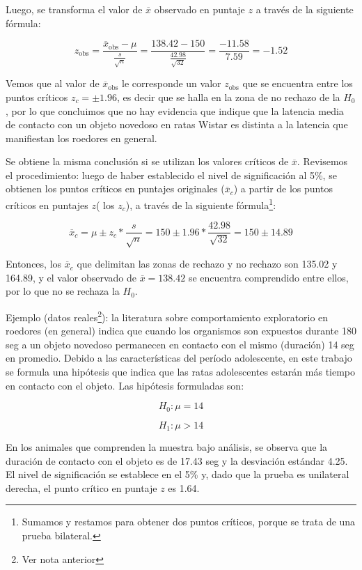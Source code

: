 \documentclass[]{book}
\let\rmarkdownfootnote\footnote%
\def\footnote{\protect\rmarkdownfootnote}
\begin{document}
Luego, se transforma el valor de \(\overline{x}\) observado en puntaje \(z\) a través de la siguiente fórmula:

\[z_{\text{obs}} = \frac{{\overline{x}}_{\text{obs}} - \mu}{\frac{s}{\sqrt{n}}} = \frac{138.42 - 150}{\frac{42.98}{\sqrt{32}}} = \frac{- 11.58}{7.59} = - 1.52\]

Vemos que al valor de \({\overline{x}}_{\text{obs}}\) le corresponde un
valor \(z_{\text{obs}}\) que se encuentra entre los puntos críticos \(z_{c}=\pm 1.96\), es decir que se halla en la zona de no rechazo de la \(H_{0}\), por lo que concluimos que no hay evidencia que indique que la latencia media de contacto con un objeto novedoso en ratas Wistar es distinta a la latencia que manifiestan los roedores en general.

Se obtiene la misma conclusión si se utilizan los valores críticos de
\(\overline{x}\). Revisemos el procedimiento: luego de haber establecido
el nivel de significación al 5\%, se obtienen los puntos críticos en
puntajes originales (\({\overline{x}}_{c}\)) a partir de los puntos
críticos en puntajes \(z\)( los \(z_{c}\)), a través de la siguiente
fórmula\footnote{Sumamos y restamos para obtener dos puntos críticos, porque se trata de una prueba bilateral.}:

\[{\overline{x}}_{c} = \mu \pm z_{c}*\frac{s}{\sqrt{n}} = 150 \pm 1.96*\frac{42.98}{\sqrt{32}} = 150 \pm 14.89\]

Entonces, los \({\overline{x}}_{c}\) que delimitan las zonas de rechazo y
no rechazo son 135.02 y 164.89, y el valor observado de
\(\overline{x} = 138.42\) se encuentra comprendido entre ellos, por lo que no se rechaza la \(H_{0}\).

Ejemplo (datos reales\footnote{Ver nota anterior}): la literatura sobre comportamiento
exploratorio en roedores (en general) indica que cuando los organismos
son expuestos durante 180 seg a un objeto novedoso permanecen en
contacto con el mismo (duración) 14 seg en promedio. Debido a las
características del período adolescente, en este trabajo se formula una
hipótesis que indica que las ratas adolescentes estarán más tiempo en
contacto con el objeto. Las hipótesis formuladas son:

\[H_{0}:\mu = 14\]

\[H_{1}:\mu > 14\]

En los animales que comprenden la muestra bajo análisis, se observa que
la duración de contacto con el objeto es de 17.43 seg y la desviación
estándar 4.25. El nivel de significación se establece en el 5\% y, dado
que la prueba es unilateral derecha, el punto crítico en puntaje \(z\) es
1.64.
\end{document}
